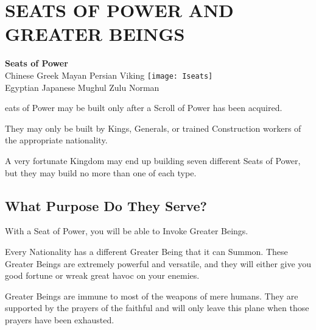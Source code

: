 
\chapter{\textsf{SEATS OF POWER AND GREATER BEINGS}}


\begin{center}
    \textbf{Seats of Power}
    \\ Chinese Greek Mayan Persian Viking
    \texttt{[image: Iseats]} %
    \\ Egyptian Japanese Mughul Zulu Norman
\end{center}

eats of Power may be built only after a Scroll of Power has been acquired.

They may only be built by Kings, Generals, or trained Construction workers of the appropriate nationality.

A very fortunate Kingdom may end up building seven different Seats of Power, but they may build no more than one of each type.

\section{\textsf{What Purpose Do They Serve?}}

With a Seat of Power, you will be able to Invoke Greater Beings.

Every Nationality has a different Greater Being that it can Summon. These Greater Beings are extremely powerful and versatile, and they will either give you good fortune or wreak great havoc on your enemies.

Greater Beings are immune to most of the weapons of mere humans. They are supported by the prayers of the faithful and will only leave this plane when those prayers have been exhausted.

